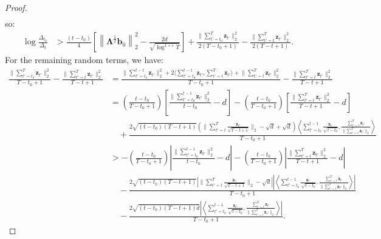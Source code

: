 \begin{proof}
\begin{align*}
\end{align*}
so:
\begin{align*}
    \log \frac{\Delta_{t_0}}{\Delta_t} &> \frac{(t-t_0)}{4}\left[\left\lVert\boldsymbol{\Lambda}^{\frac{1}{2}}\mathbf{b}_0\right\rVert_2^2 - \frac{2d}{\sqrt{\log^{1+\varepsilon}  T}}\right] + \frac{\lVert\sum_{t'=t_0}^T\mathbf{z}_{t'}\rVert_2^2}{2(T-t_0+1)} - \frac{\lVert\sum_{t'=t}^T\mathbf{z}_{t'}\rVert_2^2}{2(T-t+1)}. 
\end{align*}
For the remaining random terms, we have:
\small
\begin{align*}
    \frac{\lVert\sum_{t'=t_0}^T\mathbf{z}_{t'}\rVert_2^2}{T-t_0+1} - \frac{\lVert\sum_{t'=t}^T\mathbf{z}_{t'}\rVert_2^2}{T-t+1} &=
    \frac{\lVert\sum_{t'=t_0}^{t-1}\mathbf{z}_{t'}\rVert_2^2 + 2\langle \sum_{t'=t_0}^{t-1}\mathbf{z}_{t'}, \sum_{t'=t}^{T}\mathbf{z}_{t'}\rangle + \lVert\sum_{t'=t}^{T}\mathbf{z}_{t'}\rVert_2^2}{T-t_0+1}  - \frac{\lVert\sum_{t'=t}^T\mathbf{z}_{t'}\rVert_2^2}{T-t+1} \\
    &= \left(\frac{t-t_0}{T-t_0+1}\right)\left[\frac{\lVert\sum_{t'=t_0}^{t-1}\mathbf{z}_{t'}\rVert_2^2}{t-t_0} - d\right] - \left(\frac{t-t_0}{T-t_0+1}\right)\left[\frac{\lVert\sum_{t'=t}^T\mathbf{z}_{t'}\rVert_2^2}{T-t+1} -d \right] \\
    &\quad +\frac{2\sqrt{(t-t_0)(T-t+1)}\left(\lVert\sum_{t'=t}^{T}\frac{\mathbf{z}_{t'}}{\sqrt{T-t+1}}\rVert_2 -\sqrt{d} + \sqrt{d}\right)\left\langle \sum_{t'=t_0}^{t-1}\frac{\mathbf{z}_{t'}}{\sqrt{t-t_0}}, \frac{\sum_{t'=t}^{T}\mathbf{z}_{t'}}{\lVert\sum_{t'=t}^{T}\mathbf{z}_{t'}\rVert_2}\right\rangle}{T-t_0+1} \\
    &> -\left(\frac{t-t_0}{T-t_0+1}\right)\left|\frac{\lVert\sum_{t'=t_0}^{t-1}\mathbf{z}_{t'}\rVert_2^2}{t-t_0} - d\right| - \left(\frac{t-t_0}{T-t_0+1}\right)\left|\frac{\lVert\sum_{t'=t}^T\mathbf{z}_{t'}\rVert_2^2}{T-t+1} -d \right| \\
    &\quad -\frac{2\sqrt{(t-t_0)(T-t+1)}\left|\lVert\sum_{t'=t}^{T}\frac{\mathbf{z}_{t'}}{\sqrt{T-t+1}}\rVert_2 -\sqrt{d}\right|\left|\left\langle \sum_{t'=t_0}^{t-1}\frac{\mathbf{z}_{t'}}{\sqrt{t-t_0}}, \frac{\sum_{t'=t}^{T}\mathbf{z}_{t'}}{\lVert\sum_{t'=t}^{T}\mathbf{z}_{t'}\rVert_2}\right\rangle\right|}{T-t_0+1} \\
    &\quad-\frac{2\sqrt{(t-t_0)(T-t+1)d}\left|\left\langle \sum_{t'=t_0}^{t-1}\frac{\mathbf{z}_{t'}}{\sqrt{t-t_0}}, \frac{\sum_{t'=t}^{T}\mathbf{z}_{t'}}{\lVert\sum_{t'=t}^{T}\mathbf{z}_{t'}\rVert_2}\right\rangle\right|}{T-t_0+1}.
\end{align*}
\normalsize

\end{proof}
